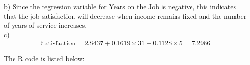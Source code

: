 \documentclass[12pt]{article}
\begin{document}
b) Since the regression variable for Years on the Job is negative, this indicates that the job satisfaction will decrease when income remains fixed and the number of years of service increases. \\

c)
\begin{eqnarray*}
  \text{Satisfaction} = 2.8437 + 0.1619 \times 31 - 0.1128 \times 5 = 7.2986
\end{eqnarray*}


\appendix
\appendixpage

The R code is listed below:


\end{document}
